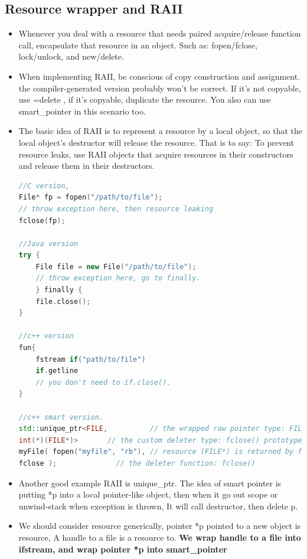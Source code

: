 \documentclass[a4paper,11pt,twoside]{book}
\begin{document}
\subsection{Resource wrapper and RAII}
\begin{itemize}
	\item Whenever you deal with a resource that needs paired acquire/release function call, encapsulate that resource in an object.  Such as: fopen/fclose, lock/unlock, and new/delete.
	
	\item When implementing RAII, be conscious of copy construction and assignment. the compiler-generated version probably won't be correct. If it's not copyable, use =delete , if it's copyable, duplicate the resource.  You also can use smart\_pointer in this scenario too.
	
	\item The basic idea of RAII  is to represent a resource by a local object, so that the local object's destructor will release the resource.  That is to say: To prevent resource leaks, use RAII objects that acquire resources in their constructors and release them in their destructors.
\begin{lstlisting}[frame=single, language=c++]
//C version,
File* fp = fopen("/path/to/file");
// throw exception here, then resource leaking
fclose(fp);
	
//Java version
try {
	File file = new File("/path/to/file");
	// throw exception here, go to finally.
	} finally {
	file.close();
}
	
//c++ version
fun{
	fstream if("path/to/file")
	if.getline
	// you don't need to if.close().
}

//c++ smart version.
std::unique_ptr<FILE,          // the wrapped raw pointer type: FILE*
int(*)(FILE*)>       // the custom deleter type: fclose() prototype
myFile( fopen("myfile", "rb"), // resource (FILE*) is returned by fopen()
fclose );              // the deleter function: fclose()
\end{lstlisting}
	
	\item Another good example RAII is unique\_ptr. The idea of smart pointer is putting *p into a local pointer-like object, then when it go out scope or unwind-stack when exception is thrown, It will call destructor, then delete p.
	
	\item We should consider resource generically, pointer *p pointed to a new object is resource, A handle to a file is a resource to. \textbf{We wrap handle to a file into ifstream, and wrap pointer *p into smart\_pointer}
	

\end{itemize}
\end{document}
